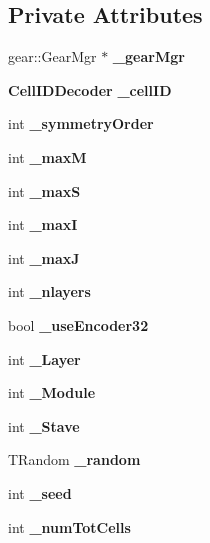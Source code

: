 \subsection*{Private Attributes}
\begin{DoxyCompactItemize}
\item 
gear\-::\-Gear\-Mgr $\ast$ {\bfseries \-\_\-gear\-Mgr}\label{classdigisim_1_1RandomCellSelector_ade71011e1f57476d105fc9479ab87469}

\item 
{\bf Cell\-I\-D\-Decoder} {\bfseries \-\_\-cell\-I\-D}\label{classdigisim_1_1RandomCellSelector_a1fb4b55bc5463c9d50e79459fa3e0e91}

\item 
int {\bfseries \-\_\-symmetry\-Order}\label{classdigisim_1_1RandomCellSelector_a5a3bf0a3b6f06079608c539868b28efc}

\item 
int {\bfseries \-\_\-max\-M}\label{classdigisim_1_1RandomCellSelector_a0df8bce5fad5dab347494b1494987422}

\item 
int {\bfseries \-\_\-max\-S}\label{classdigisim_1_1RandomCellSelector_ab390c4fd7f3aba78b30190e8e475fee1}

\item 
int {\bfseries \-\_\-max\-I}\label{classdigisim_1_1RandomCellSelector_aa34bf7f73f1563157ea8a2d4102ced1c}

\item 
int {\bfseries \-\_\-max\-J}\label{classdigisim_1_1RandomCellSelector_a8f193b8fd6b55a1d03fa8faeebe51e0f}

\item 
int {\bfseries \-\_\-nlayers}\label{classdigisim_1_1RandomCellSelector_a0967d00423125896764dddafd87678e0}

\item 
bool {\bfseries \-\_\-use\-Encoder32}\label{classdigisim_1_1RandomCellSelector_a82b47a95920e43853214352d1375d6b0}

\item 
int {\bfseries \-\_\-\-Layer}\label{classdigisim_1_1RandomCellSelector_aff30f83a262fa9a34856ffebaf874421}

\item 
int {\bfseries \-\_\-\-Module}\label{classdigisim_1_1RandomCellSelector_ae64969bde9ae87a8ccc594fc1e3de712}

\item 
int {\bfseries \-\_\-\-Stave}\label{classdigisim_1_1RandomCellSelector_ad50abf08f47c1485ebff9bf80ffd11d1}

\item 
T\-Random {\bfseries \-\_\-random}\label{classdigisim_1_1RandomCellSelector_aa3735334971457bee6190453076626d2}

\item 
int {\bfseries \-\_\-seed}\label{classdigisim_1_1RandomCellSelector_acf8dbe334144207374f82bc5fecb3bc1}

\item 
int {\bfseries \-\_\-num\-Tot\-Cells}\label{classdigisim_1_1RandomCellSelector_a4e709113e93171de3a57163bc96b8b9d}

\end{DoxyCompactItemize}


